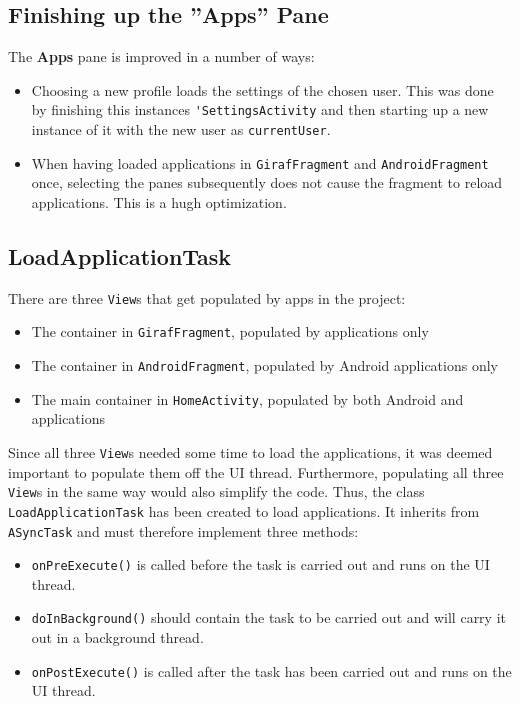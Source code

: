 \subsection{Finishing up the ''Apps'' Pane}

The \textbf{Apps} pane is improved in a number of ways:
\begin{itemize}
\item Choosing a new profile loads the settings of the chosen user.
This was done by finishing this instances \lstinline|'SettingsActivity| and then starting up a new instance of it with the new user as \lstinline|currentUser|.
\item When having loaded applications in \lstinline|GirafFragment| and \lstinline|AndroidFragment| once, selecting the panes subsequently does not cause the fragment to reload applications. This is a hugh optimization.
\end{itemize}

\subsection{LoadApplicationTask}\label{sec:sprint4:dev:loadapplicationtask}
There are three \lstinline!View!s that get populated by apps in the \launcher project:

\begin{itemize}
\item The container in \lstinline!GirafFragment!, populated by \giraf applications only
\item The container in \lstinline!AndroidFragment!, populated by Android applications only
\item The main container in \lstinline!HomeActivity!, populated by both Android and \giraf applications
\end{itemize}

Since all three \lstinline!View!s needed some time to load the applications, it was deemed important to populate them off the UI thread.
Furthermore, populating all three \lstinline!View!s in the same way would also simplify the code.
Thus, the class \lstinline!LoadApplicationTask! has been created to load applications. 
It inherits from \lstinline!ASyncTask! and must therefore implement three methods:

\begin{itemize}
\item \lstinline!onPreExecute()! is called before the task is carried out and runs on the UI thread.
\item \lstinline!doInBackground()! should contain the task to be carried out and will carry it out in a background thread.
\item \lstinline!onPostExecute()! is called after the task has been carried out and runs on the UI thread.
\end{itemize}

